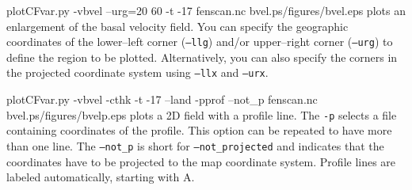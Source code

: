 \begin{pycf}{plotCFvar.py -vbvel --urg=20 60 -t -17 fenscan.nc bvel.ps}{\dir/figures/bvel.eps}
plots an enlargement of the basal velocity field. You can specify the geographic coordinates of the lower--left corner (\texttt{--llg}) and/or upper--right corner (\texttt{--urg}) to define the region to be plotted. Alternatively, you can also specify the corners in the projected coordinate system using \texttt{--llx} and \texttt{--urx}.
\end{pycf}

\begin{pycf}{plotCFvar.py -vbvel -cthk -t -17 --land -pprof --not\_p fenscan.nc bvel.ps}{\dir/figures/bvelp.eps}
plots a 2D field with a profile line. The \texttt{-p} selects a file containing coordinates of the profile. This option can be repeated to have more than one line. The \texttt{--not\_p} is short for \texttt{--not\_projected} and indicates that the coordinates have to be projected to the map coordinate system. Profile lines are labeled automatically, starting with A.
\end{pycf}
